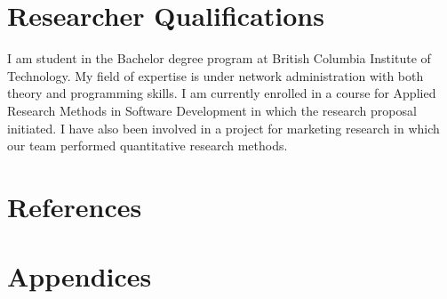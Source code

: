 \documentclass[titlepage]{article}
\begin{document}
\clearpage

\section{Researcher Qualifications}
I am student in the Bachelor degree program at British Columbia Institute of Technology.
My field of expertise is under network administration with both theory and programming skills.
I am currently enrolled in a course for Applied Research Methods in Software Development
in which the research proposal initiated.  I have also been involved in a project for
marketing research in which our team performed quantitative research methods.

\clearpage

\section{References}



{}

\clearpage

\section{Appendices}
\end{document}
